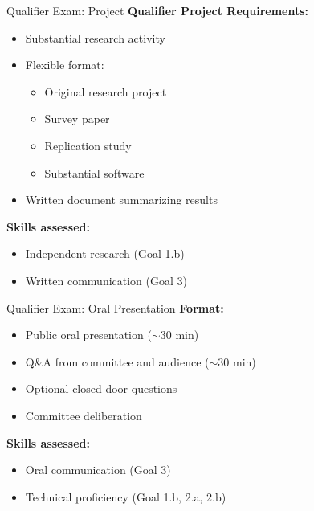 \documentclass{beamer}
\begin{document}
\begin{frame}{Qualifier Exam: Project}
\textbf{Qualifier Project Requirements:}

\vspace{0.3cm}
\begin{itemize}
    \item Substantial research activity
    \item Flexible format:
    \begin{itemize}
        \item Original research project
        \item Survey paper
        \item Replication study
        \item Substantial software
    \end{itemize}
    \item Written document summarizing results
\end{itemize}

\vspace{0.5cm}
\textbf{Skills assessed:}
\begin{itemize}
    \item Independent research (Goal 1.b)
    \item Written communication (Goal 3)
\end{itemize}
\end{frame}

\begin{frame}{Qualifier Exam: Oral Presentation}
\textbf{Format:}
\begin{itemize}
    \item Public oral presentation ($\sim$30 min)
    \item Q\&A from committee and audience ($\sim$30 min)
    \item Optional closed-door questions
    \item Committee deliberation
\end{itemize}

\vspace{0.5cm}
\textbf{Skills assessed:}
\begin{itemize}
    \item Oral communication (Goal 3)
    \item Technical proficiency (Goal 1.b, 2.a, 2.b)
\end{itemize}
\end{frame}
\end{document}
